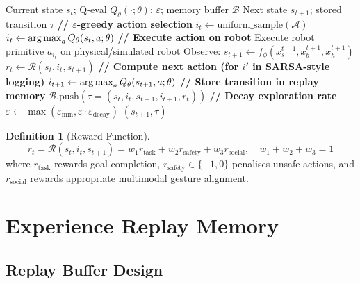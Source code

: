 \documentclass[12pt,a4paper]{article}
\theoremstyle{definition}
\newtheorem{definition}{Definition}[section]
\theoremstyle{plain}
\theoremstyle{remark}
\newcommand{\argmax}{\operatornamewithlimits{arg\,max}}
\newcommand{\Qeval}{Q_\theta}
\begin{document}
\begin{algorithm}[H]
\caption{Robot Interaction and Transition Generation}
\label{alg:robot_interact}
\begin{algorithmic}[1]
\Require Current state $s_t$; Q-eval $\Qeval(\cdot;\theta)$; $\varepsilon$; memory buffer $\mathcal{B}$
\Ensure Next state $s_{t+1}$; stored transition $\tau$
\State \textbf{// $\varepsilon$-greedy action selection}
  \State $i_t \gets \text{uniform\_sample}(\mathcal{A})$ 
\Else
  \State $i_t \gets \argmax_{a} \Qeval(s_t, a;\theta)$ 
\EndIf
\State \textbf{// Execute action on robot}
\State Execute robot primitive $a_{i_t}$ on physical/simulated robot
\State Observe: $s_{t+1} \gets f_\phi(x_s^{t+1}, x_b^{t+1}, x_h^{t+1})$ 
\State $r_t \gets \mathcal{R}(s_t, i_t, s_{t+1})$ 
\State \textbf{// Compute next action (for $i'$ in SARSA-style logging)}
\State $i_{t+1} \gets \argmax_a \Qeval(s_{t+1}, a;\theta)$ 
\State \textbf{// Store transition in replay memory}
\State $\mathcal{B}.\text{push}(\tau = (s_t, i_t, s_{t+1}, i_{t+1}, r_t))$
\State \textbf{// Decay exploration rate}
\State $\varepsilon \gets \max(\varepsilon_{\min}, \varepsilon \cdot \varepsilon_{\text{decay}})$
\State \Return $(s_{t+1}, \tau)$
\end{algorithmic}
\end{algorithm}

\begin{definition}[Reward Function]
\[
  r_t = \mathcal{R}(s_t, i_t, s_{t+1}) = w_1 r_{\text{task}} + w_2 r_{\text{safety}} + w_3 r_{\text{social}},
  \quad w_1 + w_2 + w_3 = 1
\]
where $r_{\text{task}}$ rewards goal completion, $r_{\text{safety}} \in \{-1, 0\}$ penalises unsafe actions, and $r_{\text{social}}$ rewards appropriate multimodal gesture alignment.
\end{definition}

\newpage
\section{Experience Replay Memory}
\label{sec:memory}

\subsection{Replay Buffer Design}
\end{document}
